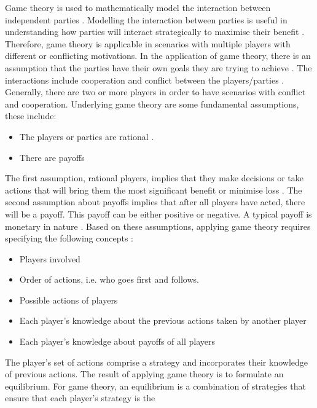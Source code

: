 Game theory is used to mathematically model the interaction between independent parties \cite{Dubina2013}. Modelling the interaction between parties is useful in understanding how parties will interact
strategically to maximise their benefit \cite{brandenburger2002use}. Therefore, game theory is applicable in scenarios with multiple
players with different or conflicting motivations.
\newline\newline
In the application of game theory, there is an assumption that the
parties have their own goals they are trying to achieve \cite{Dubina2013}. The interactions include cooperation and conflict between the
players/parties \cite{bomze1986non}. Generally, there are two or more players
in order to have scenarios with conflict and cooperation. Underlying
game theory are some fundamental assumptions, these include:
\begin{itemize}
    \item  The players or parties are rational \cite{kaplinski2010game}.
    \item There are payoffs \cite{osborne1994course}
\end{itemize}
The first assumption, rational players, implies that they make
decisions or take actions that will bring them the most significant
benefit or minimise loss \cite{osborne1994course}. The second assumption about
payoffs implies that after all players have acted, there will be a
payoff. This payoff can be either positive or negative. A typical payoff
is monetary in nature \cite{owen2001empirical}.
\newline\newline
Based on these assumptions, applying game theory requires specifying
the following concepts \cite{owen2001empirical}:
\begin{itemize}
\item Players involved
\item Order of actions, i.e. who goes first and follows.
\item Possible actions of players 
\item Each player's knowledge about the previous actions taken by another player
\item Each player's knowledge about payoffs of all players
\end{itemize}
The player's set of actions comprise a strategy and incorporates
their knowledge of previous actions. The result of applying game theory
is to formulate an equilibrium. For game theory, an equilibrium is a
combination of strategies that ensure that each player's strategy is the
